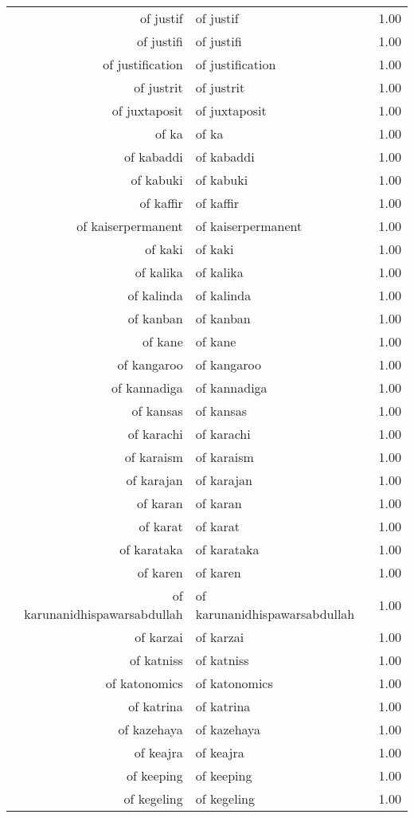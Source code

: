 \begin{table}[ht]
\begin{tabular}{rlr}
  of justif & of justif & 1.00 \\ 
  of justifi & of justifi & 1.00 \\ 
  of justification & of justification & 1.00 \\ 
  of justrit & of justrit & 1.00 \\ 
  of juxtaposit & of juxtaposit & 1.00 \\ 
  of ka & of ka & 1.00 \\ 
  of kabaddi & of kabaddi & 1.00 \\ 
  of kabuki & of kabuki & 1.00 \\ 
  of kaffir & of kaffir & 1.00 \\ 
  of kaiserpermanent & of kaiserpermanent & 1.00 \\ 
  of kaki & of kaki & 1.00 \\ 
  of kalika & of kalika & 1.00 \\ 
  of kalinda & of kalinda & 1.00 \\ 
  of kanban & of kanban & 1.00 \\ 
  of kane & of kane & 1.00 \\ 
  of kangaroo & of kangaroo & 1.00 \\ 
  of kannadiga & of kannadiga & 1.00 \\ 
  of kansas & of kansas & 1.00 \\ 
  of karachi & of karachi & 1.00 \\ 
  of karaism & of karaism & 1.00 \\ 
  of karajan & of karajan & 1.00 \\ 
  of karan & of karan & 1.00 \\ 
  of karat & of karat & 1.00 \\ 
  of karataka & of karataka & 1.00 \\ 
  of karen & of karen & 1.00 \\ 
  of karunanidhispawarsabdullah & of karunanidhispawarsabdullah & 1.00 \\ 
  of karzai & of karzai & 1.00 \\ 
  of katniss & of katniss & 1.00 \\ 
  of katonomics & of katonomics & 1.00 \\ 
  of katrina & of katrina & 1.00 \\ 
  of kazehaya & of kazehaya & 1.00 \\ 
  of keajra & of keajra & 1.00 \\ 
  of keeping & of keeping & 1.00 \\ 
  of kegeling & of kegeling & 1.00 \\ 

\end{tabular}
\end{table}
